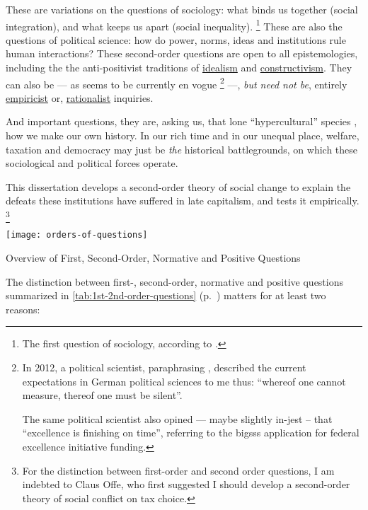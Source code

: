 These are variations on the questions of sociology:
what binds us together (social integration), and what keeps us apart (social inequality).
\footnote{
	The first question of sociology, according to \citet[66]{Dahrendorf1966}.
}
These are also the questions of political science:
how do power, norms, ideas and institutions rule human interactions?
These second-order questions are open to all epistemologies, including the the anti-positivist traditions of \hyperref[itm:idealism]{idealism} and \hyperref[itm:constructivism]{constructivism}.
They can also be --- as seems to be currently en vogue
\footnote{
	In 2012, a political scientist, paraphrasing \cite{Wittgenstein1998}, described the current expectations in German political sciences to me thus:
	``whereof one cannot measure, thereof one must be silent''.

	The same political scientist also opined --- maybe slightly in-jest -- that ``excellence is finishing on time'', referring to the \gls{bigsss} application for federal excellence initiative funding.
}
---, \emph{but need not be}, entirely  \hyperref[itm:empiricism]{empiricist} or, \hyperref[itm:rationalism]{rationalist} inquiries.

And important questions, they are, asking us, that lone ``hypercultural'' species \citep{Henrich2004}, how we make our own history.
In our rich time and in our unequal place, welfare, taxation and democracy may just be \emph{the} historical battlegrounds, on which these sociological and political forces operate.

This dissertation develops a second-order theory of social change to explain the defeats these institutions have suffered in late capitalism, and tests it empirically.
\footnote{
	For the distinction between first-order and second order questions, I am indebted to Claus Offe, who first suggested I should develop a second-order theory of social conflict on tax choice.
}

\begin{table}[htbp]
	\centering
	\texttt{[image: orders-of-questions]}
	\caption{Overview of First, Second-Order, Normative and Positive Questions}
	\label{tab:1st-2nd-order-questions}
\end{table}

The distinction between first-, second-order, normative and positive questions summarized in \autoref{tab:1st-2nd-order-questions} (p.~\pageref{tab:1st-2nd-order-questions}) matters for at least two reasons:

